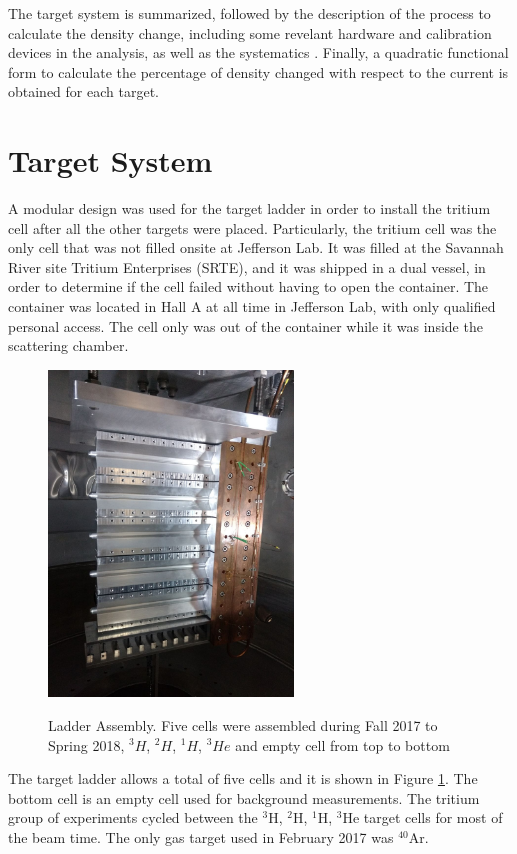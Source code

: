 \documentclass[final,5p,times,twocolumn,balance]{elsarticle}
\begin{document}
The target system is summarized, followed by the description of the process to calculate the density change, including 
some revelant hardware and calibration devices in the analysis, as well as the systematics . Finally, a quadratic functional form 
to calculate the percentage of density changed with respect to the current is  obtained for each target.


\section{Target System}

A modular design was used for the target ladder in order to install the tritium cell after all the other targets were placed. 
Particularly, the tritium cell was the only cell that was not filled onsite at Jefferson Lab. It was filled at the Savannah River 
site Tritium Enterprises (SRTE), and it was shipped in a dual vessel, in order  to determine if the cell failed without having to
open the container. The container was located in Hall A at all time in Jefferson Lab, with only qualified personal access. The cell only was out of the container while it was inside the scattering chamber. 

\begin{figure}[htbp]
\centering
  \includegraphics[width=6.5cm]{images/ladder.jpg}\\
  \caption{Ladder Assembly. Five cells were assembled during Fall 2017 to Spring 2018, $^{3}H$, $^{2}H$, $^{1}H $, $^{3}He$ and empty cell from top to bottom
 }\label{ladder}
\end{figure}

The target ladder allows a total of five cells and it is shown in Figure \ref{ladder}.  The bottom cell is an empty cell used for background measurements. The tritium group of experiments cycled between the $^{3}$H, $^{2}$H, $^{1}$H, $^{3}$He target cells for most of the beam time. The only gas target used in February 2017 was $^{40}$Ar.
\end{document}
